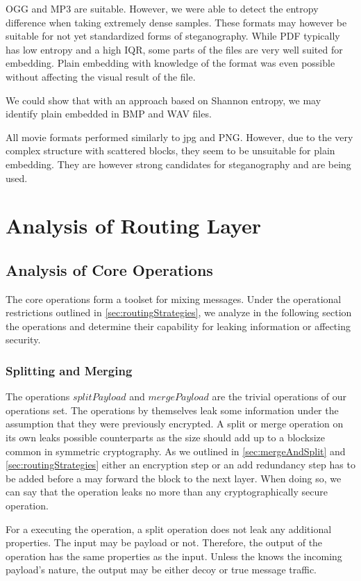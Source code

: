 OGG and MP3 are suitable. However, we were able to detect the entropy difference when taking extremely dense samples. These formats may however be suitable for not yet standardized forms of steganography. While PDF typically has low entropy and a high IQR, some parts of the files are very well suited for embedding. Plain embedding with knowledge of the format was even possible without affecting the visual result of the file.

We could show that with an approach based on Shannon entropy, we may identify plain embedded \VortexMessages{} in BMP and WAV files. 

All movie formats performed similarly to jpg and PNG. However, due to the very complex structure with scattered blocks, they seem to be unsuitable for plain embedding. They are however strong candidates for steganography and are being used.

\section{Analysis of Routing Layer}
\subsection{Analysis of Core Operations}
The core operations form a toolset for mixing messages. Under the operational restrictions outlined in \cref{sec:routingStrategies}, we analyze in the following section the operations and determine their capability for leaking information or affecting security.

\subsubsection{Splitting and Merging}
The operations $splitPayload$ and $mergePayload$ are the trivial operations of our operations set. The operations by themselves leak some information under the assumption that they were previously encrypted. A split or merge operation on its own leaks possible counterparts as the size should add up to a blocksize common in symmetric cryptography. As we outlined in \cref{sec:mergeAndSplit} and \cref{sec:routingStrategies} either an encryption step or an add redundancy step has to be added before a \VortexNode{} may forward the block to the next layer. When doing so, we can say that the operation leaks no more than any cryptographically secure operation.

For a \VortexNode{} executing the operation, a split operation does not leak any additional properties. The input may be payload or not. Therefore, the output of the operation has the same properties as the input. Unless the \VortexNodes{} knows the incoming payload's nature, the output may be either decoy or true message traffic.

